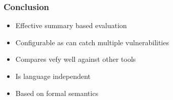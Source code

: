 \documentclass{beamer}
\begin{document}
\begin{frame}
  \frametitle{Conclusion}
  \begin{itemize}
    \item Effective summary based evaluation
    \item Configurable as can catch multiple vulnerabilities
    \item Compares vefy well against other tools
    \item Is language independent
    \item Based on formal semantics
  \end{itemize}
\end{frame}
\end{document}
